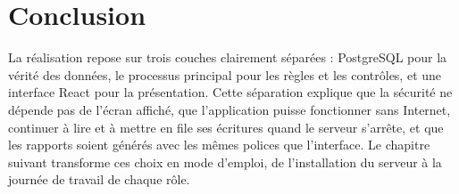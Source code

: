 \section{Conclusion}
La réalisation repose sur trois couches clairement séparées : PostgreSQL pour la vérité des données,
le processus principal pour les règles et les contrôles, et une interface React pour la présentation.
Cette séparation explique que la sécurité ne dépende pas de l'écran affiché, que l'application puisse
fonctionner sans Internet, continuer à lire et à mettre en file ses écritures quand le serveur
s'arrête, et que les rapports soient générés avec les mêmes polices que l'interface. Le
chapitre suivant transforme ces choix en mode d'emploi, de l'installation du serveur à la journée de
travail de chaque rôle.
